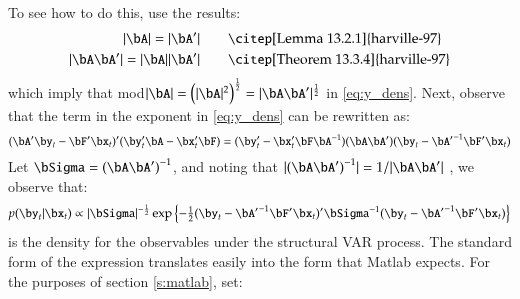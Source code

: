 \documentclass [12pt]{article}
\begin{document}
    To see how to do this, use the results:
    \begin{align*}
        |\bA | = | \bA'| \qquad &\text{\citep[Lemma 13.2.1]{harville-97}} \\
        |\bA \bA' | = |\bA | |\bA'| \qquad &\text{\citep[Theorem 13.3.4]{harville-97}}
    \end{align*}
    which imply that mod$|\bA|=\left({|\bA|^2}\right)^{\frac{1}{2}}=|\bA\bA'|^{\frac{1}{2}}$ in \eqref{eq:y_dens}.
    Next, observe that the term in the exponent in \eqref{eq:y_dens} can be rewritten as:
    \begin{equation*}
        (\bA'\by_t - \bF'\bx_t)'(\by_t' \bA - \bx_t'\bF) = (\by_t' - \bx_t'\bF\bA^{-1})(\bA\bA')(\by_t - {\bA'}^{-1}\bF'\bx_t)
    \end{equation*}
    Let $\bSigma = {(\bA\bA')}^{-1}$, and noting that $|{(\bA\bA')}^{-1}|=1/|\bA\bA'|$ \citep[Theorem 13.3.7]{harville-97}, we observe that:
    \begin{equation}\label{eq:y_dens_final}
        p( \by_t | \bx_t ) \propto |\bSigma|^{-\frac{1}{2}}\exp\left\{ -\tfrac{1}{2} (\by_t - {\bA'}^{-1}\bF'\bx_t)'\bSigma^{-1}(\by_t - {\bA'}^{-1}\bF'\bx_t) \right\}
    \end{equation}
    is the density for the observables under the structural VAR process.  The standard form of the expression translates easily into the form that Matlab expects.  For the purposes of section \ref{s:matlab}, set:

\end{document}
